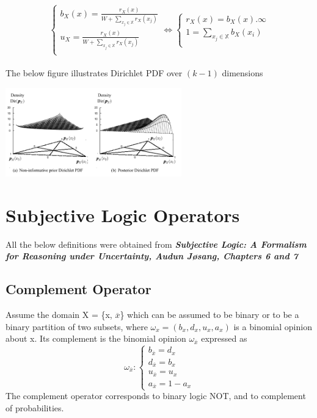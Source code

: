 \documentclass[UTF8]{article}
\newcommand{\mycite}[1]{\textbf{\textit{#1}}}
\begin{document}
$$
\begin{cases}
    b_X(x) = \frac{r_X(x)}{W + \sum_{x_j \in \mathbb{X}} r_X(x_j)}\\
    u_X = \frac{r_X(x)}{W + \sum_{x_j \in \mathbb{X}} r_X(x_j)}\\
\end{cases}
\Leftrightarrow
\begin{cases}
    r_X(x) = b_X(x) . \infty\\
    1 = \sum_{x_j \in \mathbb{X}} b_X(x_i)\\
\end{cases}
$$
\\
The below figure illustrates Dirichlet PDF over $(k - 1)$ dimensions
\begin{center}
    \includegraphics[width=3in]{images/dirich.png}
\end{center}
\section{Subjective Logic Operators}

All the below definitions were obtained from \mycite{Subjective Logic: A Formalism for Reasoning under Uncertainty, Audun Jøsang, Chapters 6 and 7}\\
\subsection{Complement Operator}
Assume the domain X = \{x, $\overline{x}$\} which can be
assumed to be binary or to be a binary partition of two subsets, where $\omega_x =
(b_x, d_x, u_x, a_x)$ is a binomial opinion about x. Its complement is the binomial opinion
$\omega_{\overline{x}}$ expressed as
$$
\omega_{\overline{x}}: 
\begin{cases}
    b_{\overline{x}} = d_x\\    
    d_{\overline{x}} = b_x\\
    u_{\overline{x}} = u_x\\
    a_{\overline{x}} = 1 - a_x
\end{cases}
$$
The complement operator corresponds to binary logic NOT, and to complement
of probabilities.
\end{document}
